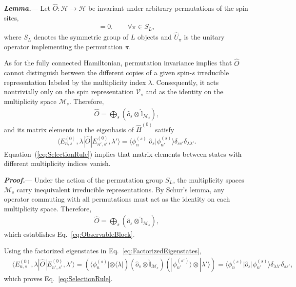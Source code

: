 \documentclass[aps,prl,amsfonts,floatfix,superscriptaddress,longbibliography,twocolumn,footinbib]{revtex4-2}
\begin{document}
\textit{\textbf{Lemma.}}---
Let $\hat O:\mathcal H\rightarrow\mathcal H$ be invariant under arbitrary permutations of the spin sites,
\begin{align}
[\hat O,\hat U_\pi]=0,
\qquad
\forall \pi\in S_L,
\end{align}
where $S_L$ denotes the symmetric group of $L$ objects and $\hat U_\pi$ is the unitary operator implementing the permutation $\pi$. 

As for the fully connected Hamiltonian, permutation invariance implies that
$\hat O$ cannot distinguish between the different copies of a given
spin-$s$ irreducible representation labeled by the multiplicity index
$\lambda$. Consequently, it acts nontrivially only on the spin
representation $\mathcal V_s$ and as the identity on the multiplicity
space $\mathcal M_s$. Therefore,
\begin{align}
\hat O
=
\bigoplus_s
\left(
\hat o_s
\otimes
\hat{\mathbb I}_{\mathcal M_s}
\right),
\label{eq:ObservableBlock}
\end{align}
and its matrix elements in the eigenbasis of $\hat H^{(0)}$ satisfy
\begin{align}
\langle E_{n,s}^{(0)},\lambda|
\hat O
|E_{n',s'}^{(0)},\lambda'\rangle =
\langle \phi_n^{(s)}
|
\hat o_s
|
\phi_{n'}^{(s)}
\rangle
\delta_{s s'}
\delta_{\lambda \lambda'} .
\label{eq:SelectionRule}
\end{align}
Equation~(\ref{eq:SelectionRule}) implies that matrix elements between states with different multiplicity indices vanish.

\textit{\textbf{Proof.}}---
Under the action of the permutation group $S_L$, the multiplicity spaces $\mathcal M_s$ carry inequivalent irreducible representations. By Schur's lemma, any operator commuting with all permutations must act as the identity on each multiplicity space. Therefore,
\begin{align}
\hat O
=
\bigoplus_s
\left(
\hat o_s
\otimes
\hat{\mathbb I}_{\mathcal M_s}
\right),
\end{align}
which establishes Eq.~\eqref{eq:ObservableBlock}.

Using the factorized eigenstates in Eq.~\eqref{eq:FactorizedEigenstates},
\begin{align}
&\langle E_{n,s}^{(0)},\lambda|
\hat O
|E_{n',s'}^{(0)},\lambda'\rangle =
(\langle\phi_n^{(s)}|\otimes\langle\lambda|)
(\hat o_s\otimes\hat{\mathbb I}_{\mathcal M_s})
(|\phi_{n'}^{(s')}\rangle\otimes|\lambda'\rangle)
=
\langle\phi_n^{(s)}|
\hat o_s
|\phi_{n'}^{(s)}\rangle
\delta_{\lambda\lambda'} \delta_{ss'},
\end{align}
which proves Eq.~\eqref{eq:SelectionRule}.
\end{document}
